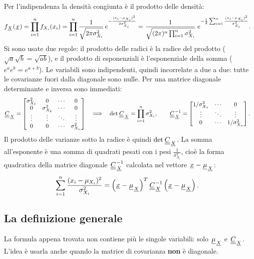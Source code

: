 \begin{dimostrazione}
 Per l'indipendenza la densità congiunta è il prodotto delle densità:
\[ f_{{\mkern1mu\underline{X}\mkern1mu}}({\mkern1mu\underline{x}\mkern1mu}) = \prod_{i=1}^{n} f_{X_i}(x_i) = \prod_{i=1}^{n} \frac{1}{\sqrt{2\pi\sigma_{X_i}^2}}\,
   e^{-\frac{(x_i - \mu_{X_i})^2}{2\sigma_{X_i}^2}} = \frac{1}{\sqrt{(2\pi)^n \prod_{i=1}^{n} \sigma_{X_i}^2}}\;
   e^{-\frac12 \sum_{i=1}^{n} \frac{(x_i - \mu_{X_i})^2}{\sigma_{X_i}^2}} . \]
Si sono usate due regole: il prodotto delle radici è la radice del prodotto ($\sqrt{a}\sqrt{b} = \sqrt{ab}$), e il
prodotto di esponenziali è l'esponenziale della somma ($e^a e^b = e^{a + b}$).
 Le variabili sono indipendenti, quindi incorrelate a due a due: tutte le
covarianze fuori dalla diagonale sono nulle. Per una matrice diagonale determinante e inversa sono immediati:
\[ {\mkern1mu\underline{\underline{C}}\mkern1mu}_{{\mkern1mu\underline{X}\mkern1mu}} = \begin{bmatrix} \sigma_{X_1}^2 & 0 & \cdots & 0 \\ 0 & \sigma_{X_2}^2 & \cdots & 0 \\ \vdots
   & \vdots & \ddots & \vdots \\ 0 & 0 & \cdots & \sigma_{X_n}^2 \end{bmatrix} \quad\Longrightarrow\quad
   \det {\mkern1mu\underline{\underline{C}}\mkern1mu}_{{\mkern1mu\underline{X}\mkern1mu}} = \prod_{i=1}^{n} \sigma_{X_i}^2 , \qquad
   {\mkern1mu\underline{\underline{C}}\mkern1mu}_{{\mkern1mu\underline{X}\mkern1mu}}^{-1} = \begin{bmatrix} 1/\sigma_{X_1}^2 & \cdots & 0 \\ \vdots & \ddots & \vdots \\ 0 & \cdots &
   1/\sigma_{X_n}^2 \end{bmatrix} . \]
Il prodotto delle varianze sotto la radice è quindi $\det {\mkern1mu\underline{\underline{C}}\mkern1mu}_{{\mkern1mu\underline{X}\mkern1mu}}$.
 La somma all'esponente è una somma di quadrati pesati con i pesi
$\frac{1}{\sigma_{X_i}^2}$, cioè la forma quadratica della matrice diagonale ${\mkern1mu\underline{\underline{C}}\mkern1mu}_{{\mkern1mu\underline{X}\mkern1mu}}^{-1}$ calcolata nel
vettore ${\mkern1mu\underline{x}\mkern1mu} - {\mkern1mu\underline{\mu}\mkern1mu}_{{\mkern1mu\underline{X}\mkern1mu}}$:
\[ \sum_{i=1}^{n} \frac{(x_i - \mu_{X_i})^2}{\sigma_{X_i}^2} = \left( {\mkern1mu\underline{x}\mkern1mu} - {\mkern1mu\underline{\mu}\mkern1mu}_{{\mkern1mu\underline{X}\mkern1mu}} \right)^T
   {\mkern1mu\underline{\underline{C}}\mkern1mu}_{{\mkern1mu\underline{X}\mkern1mu}}^{-1} \left( {\mkern1mu\underline{x}\mkern1mu} - {\mkern1mu\underline{\mu}\mkern1mu}_{{\mkern1mu\underline{X}\mkern1mu}} \right) . \]
\end{dimostrazione}

\subsection{La definizione generale}

La formula appena trovata non contiene più le singole variabili: solo ${\mkern1mu\underline{\mu}\mkern1mu}_{{\mkern1mu\underline{X}\mkern1mu}}$ e ${\mkern1mu\underline{\underline{C}}\mkern1mu}_{{\mkern1mu\underline{X}\mkern1mu}}$.
L'idea è usarla anche quando la matrice di covarianza \textbf{non} è diagonale.

